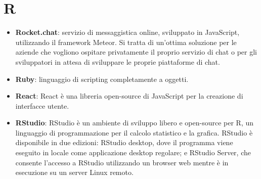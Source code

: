 \section{R}
\begin{itemize}
	\item \textbf{Rocket.chat}: servizio di messaggistica online, sviluppato in JavaScript, utilizzando il framework Meteor. Si tratta di un'ottima soluzione per le aziende che vogliono ospitare privatamente il proprio servizio di chat o per gli sviluppatori in attesa di sviluppare le proprie piattaforme di chat.
	\item \textbf{Ruby}: linguaggio di scripting completamente a oggetti.
	\item \textbf{React}: React  è una libreria open-source di JavaScript per la creazione di interfacce utente.
	\item \textbf{RStudio}: RStudio è un ambiente di sviluppo  libero e open-source per R, un linguaggio di programmazione per il calcolo statistico e la grafica. RStudio è disponibile in due edizioni: RStudio desktop, dove il programma viene eseguito in locale come applicazione desktop regolare; e RStudio Server, che consente l'accesso a RStudio utilizzando un browser web mentre è in esecuzione su un server Linux remoto.
\end{itemize}